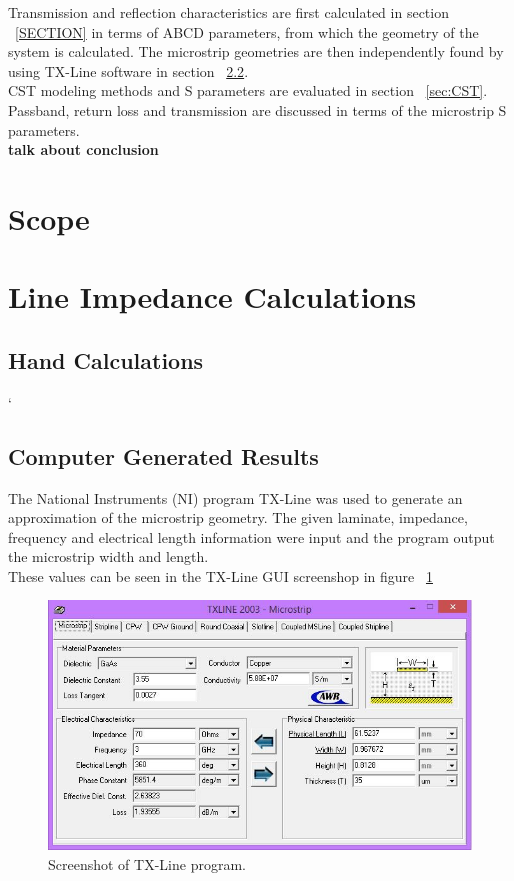 \documentclass{paper}
\begin{document}
Transmission and reflection characteristics are first calculated in section ~\ref{SECTION} in terms of ABCD parameters, from which the geometry of the system is calculated. The microstrip geometries are then independently found by using TX-Line software in section ~\ref{sec:tx-line}.\\

CST modeling methods and S parameters are evaluated in section ~\ref{sec:CST}. Passband, return loss and transmission are discussed in terms of the microstrip S parameters.\\

\textbf{talk about conclusion}





\newpage
\tableofcontents

\newpage
\section{Scope}


\newpage
\section{Line Impedance Calculations}
\subsection{Hand Calculations}
`

\subsection{Computer Generated Results}
\label{sec:tx-line}
The National Instruments (NI) program TX-Line was used to generate an approximation of the microstrip geometry. The given laminate, impedance, frequency and electrical length information were input and the program output the microstrip width and length. \\

These values can be seen in the TX-Line GUI screenshop in figure ~\ref{fig:txline}  

\begin{figure}[H]
	\centering
	\includegraphics[scale=0.6]{IMG/txline}
	\caption{Screenshot of TX-Line program.}
	\label{fig:txline}
\end{figure}
\end{document}

